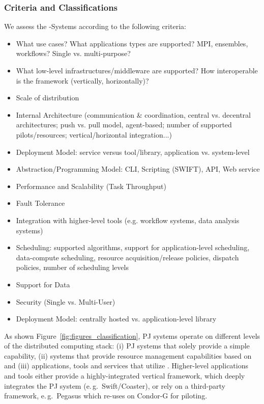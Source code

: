 \documentclass{sig-alternate}
\begin{document}
\subsubsection*{Criteria and Classifications}

We assess the \pilotjob-Systems according to the following criteria:
\begin{itemize}
	\item What use cases? What applications types are supported? MPI, ensembles, workflows? Single vs. multi-purpose?
	\item What low-level infrastructures/middleware are supported? How interoperable is the framework (vertically, horizontally)?
	\item Scale of distribution
	\item Internal Architecture (communication \& coordination, central vs. decentral architectures; push vs. pull model, agent-based; number of supported pilots/resources; vertical/horizontal integration...)
	\item Deployment Model: service versus tool/library, application vs. system-level
    \item Abstraction/Programming Model: CLI, Scripting (SWIFT), API, Web service
	\item Performance and Scalability (Task Throughput)
	\item Fault Tolerance
	\item Integration with higher-level tools (e.g. workflow systems, data analysis systems)
	\item Scheduling: supported algorithms, support for application-level 
	scheduling, data-compute scheduling, resource acquisition/release policies, dispatch policies, number of scheduling levels
	\item Support for Data
	\item Security (Single vs. Multi-User)
	\item Deployment Model: centrally hosted vs. application-level library
\end{itemize}

As shown Figure~\ref{fig:figures_classification}, PJ systems operate on
different levels of the distributed computing stack: (i) PJ systems that
solely provide a simple \pilot capability, (ii) systems that provide resource
management capabilities based on \pilots and (iii) applications, tools and
services that utilize \pilots. Higher-level applications and tools either 
provide a highly-integrated vertical framework, which deeply integrates the PJ 
system (e.\,g.\ Swift/Coaster), or rely on a third-party 
\pilotjob framework, e.\,g.\ Pegasus which re-uses on Condor-G for piloting.
\end{document}
